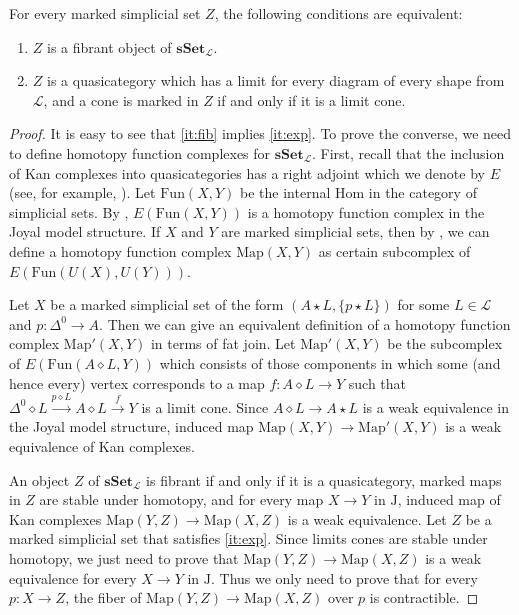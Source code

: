 \documentclass[reqno]{amsart}
\theoremstyle{definition}
\theoremstyle{remark}
\newcommand{\cat}[1]{\mathbf{#1}}
\newcommand{\sSet}{\cat{sSet}}
\newcommand{\join}{\star}
\newcommand{\fjoin}{\diamond}
\newcommand{\Map}{\mathrm{Map}}
\newcommand{\Fun}{\mathrm{Fun}}
\newcommand{\J}{\mathrm{J}}
\numberwithin{figure}{section}
\begin{document}
\begin{prop}
For every marked simplicial set $Z$, the following conditions are equivalent:
\begin{enumerate}
\item \label{it:fib} $Z$ is a fibrant object of $\sSet_\mathcal{L}$.
\item \label{it:exp} $Z$ is a quasicategory which has a limit for every diagram of every shape from $\mathcal{L}$, and a cone is marked in $Z$ if and only if it is a limit cone.
\end{enumerate}
\end{prop}
\begin{proof}
It is easy to see that \eqref{it:fib} implies \eqref{it:exp}.
To prove the converse, we need to define homotopy function complexes for $\sSet_\mathcal{L}$.
First, recall that the inclusion of Kan complexes into quasicategories has a right adjoint which we denote by $E$ (see, for example, \cite[Proposition~1.2.5.3]{lurie-topos}).
Let $\Fun(X,Y)$ be the internal Hom in the category of simplicial sets.
By \cite[Corollary~3.1.4.4]{lurie-topos}, $E(\Fun(X,Y))$ is a homotopy function complex in the Joyal model structure.
If $X$ and $Y$ are marked simplicial sets, then by , we can define a homotopy function complex $\Map(X,Y)$ as certain subcomplex of $E(\Fun(U(X),U(Y)))$.

Let $X$ be a marked simplicial set of the form $(A \join L, \{ p \join L \})$ for some $L \in \mathcal{L}$ and $p : \Delta^0 \to A$.
Then we can give an equivalent definition of a homotopy function complex $\Map'(X,Y)$ in terms of fat join.
Let $\Map'(X,Y)$ be the subcomplex of $E(\Fun(A \fjoin L, Y))$ which consists of those components in which some (and hence every) vertex
corresponds to a map $f : A \fjoin L \to Y$ such that $\Delta^0 \fjoin L \xrightarrow{p \fjoin L} A \fjoin L \xrightarrow{f} Y$ is a limit cone.
Since $A \fjoin L \to A \join L$ is a weak equivalence in the Joyal model structure, induced map $\Map(X,Y) \to \Map'(X,Y)$ is a weak equivalence of Kan complexes.

An object $Z$ of $\sSet_\mathcal{L}$ is fibrant if and only if it is a quasicategory, marked maps in $Z$ are stable under homotopy,
and for every map $X \to Y$ in $\J$, induced map of Kan complexes $\Map(Y,Z) \to \Map(X,Z)$ is a weak equivalence.
Let $Z$ be a marked simplicial set that satisfies \eqref{it:exp}.
Since limits cones are stable under homotopy, we just need to prove that $\Map(Y,Z) \to \Map(X,Z)$ is a weak equivalence for every $X \to Y$ in $\J$.
Thus we only need to prove that for every $p : X \to Z$, the fiber of $\Map(Y,Z) \to \Map(X,Z)$ over $p$ is contractible.


\end{proof}
\end{document}
